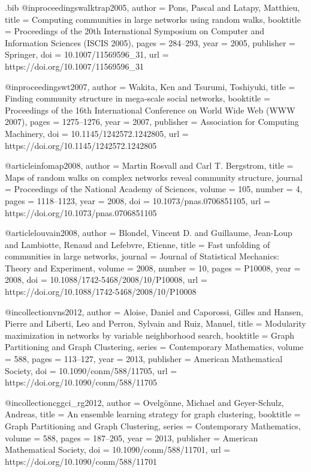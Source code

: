 \documentclass[11pt,a4paper]{article}
\begin{document}
\begin{filecontents*}[overwrite]{\jobname.bib}
@inproceedings{walktrap2005,
  author    = {Pons, Pascal and Latapy, Matthieu},
  title     = {Computing communities in large networks using random walks},
  booktitle = {Proceedings of the 20th International Symposium on Computer and Information Sciences (ISCIS 2005)},
  pages     = {284--293},
  year      = {2005},
  publisher = {Springer},
  doi       = {10.1007/11569596_31},
  url       = {https://doi.org/10.1007/11569596_31}
}

@inproceedings{wt2007,
  author    = {Wakita, Ken and Tsurumi, Toshiyuki},
  title     = {Finding community structure in mega-scale social networks},
  booktitle = {Proceedings of the 16th International Conference on World Wide Web (WWW 2007)},
  pages     = {1275--1276},
  year      = {2007},
  publisher = {Association for Computing Machinery},
  doi       = {10.1145/1242572.1242805},
  url       = {https://doi.org/10.1145/1242572.1242805}
}

@article{infomap2008,
  author  = {Martin Rosvall and Carl T. Bergstrom},
  title   = {Maps of random walks on complex networks reveal community structure},
  journal = {Proceedings of the National Academy of Sciences},
  volume  = {105},
  number  = {4},
  pages   = {1118--1123},
  year    = {2008},
  doi     = {10.1073/pnas.0706851105},
  url     = {https://doi.org/10.1073/pnas.0706851105}
}

@article{louvain2008,
  author  = {Blondel, Vincent D. and Guillaume, Jean-Loup and Lambiotte, Renaud and Lefebvre, Etienne},
  title   = {Fast unfolding of communities in large networks},
  journal = {Journal of Statistical Mechanics: Theory and Experiment},
  volume  = {2008},
  number  = {10},
  pages   = {P10008},
  year    = {2008},
  doi     = {10.1088/1742-5468/2008/10/P10008},
  url     = {https://doi.org/10.1088/1742-5468/2008/10/P10008}
}

@incollection{vns2012,
  author    = {Aloise, Daniel and Caporossi, Gilles and Hansen, Pierre and Liberti, Leo and Perron, Sylvain and Ruiz, Manuel},
  title     = {Modularity maximization in networks by variable neighborhood search},
  booktitle = {Graph Partitioning and Graph Clustering},
  series    = {Contemporary Mathematics},
  volume    = {588},
  pages     = {113--127},
  year      = {2013},
  publisher = {American Mathematical Society},
  doi       = {10.1090/conm/588/11705},
  url       = {https://doi.org/10.1090/conm/588/11705}
}

@incollection{cggci_rg2012,
  author    = {Ovelg{\"o}nne, Michael and Geyer-Schulz, Andreas},
  title     = {An ensemble learning strategy for graph clustering},
  booktitle = {Graph Partitioning and Graph Clustering},
  series    = {Contemporary Mathematics},
  volume    = {588},
  pages     = {187--205},
  year      = {2013},
  publisher = {American Mathematical Society},
  doi       = {10.1090/conm/588/11701},
  url       = {https://doi.org/10.1090/conm/588/11701}
}


\end{filecontents*}
\end{document}
